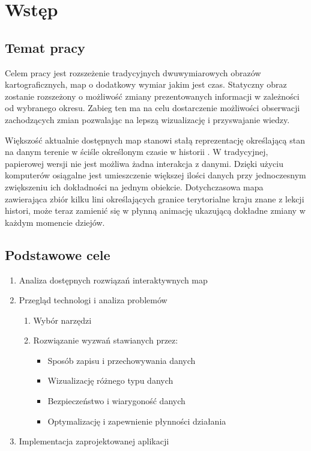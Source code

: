\chapter{Wstęp}
\label{cha:wstep}

\nocite{gisSystems}
\nocite{webgis}
\nocite{imprxml}
\nocite{perfxml}



\section{Temat pracy}
\label{sec:tematPracy}

Celem pracy jest rozszeżenie tradycyjnych dwuwymiarowych obrazów kartograficznych, map o dodatkowy wymiar jakim jest czas.
Statyczny obraz zostanie rozszeżony o możliwość zmiany prezentowanych informacji w zależności od wybranego okresu.
Zabieg ten ma na celu dostarczenie możliwości obserwacji zachodzących zmian pozwalając na lepszą wizualizację i
przyswajanie wiedzy.

Większość aktualnie dostępnych map stanowi stałą reprezentację określającą stan na danym terenie w ściśle określonym
czasie w historii . W tradycyjnej, papierowej wersji nie jest możliwa żadna interakcja z danymi. Dzięki użyciu komputerów
osiągalne jest umieszczenie
większej ilości danych przy jednoczesnym zwiększeniu ich dokładności na jednym obiekcie. Dotychczasowa mapa zawierająca
zbiór kilku lini określających granice terytorialne kraju znane z lekcji histori, może teraz zamienić się w płynną
animację ukazującą dokładne zmiany w każdym momencie dziejów.



\section{Podstawowe cele}
\label{sec:geneza}

\begin{enumerate}
  \item Analiza dostępnych rozwiązań interaktywnych map
  \item Przegląd technologi i analiza problemów
  \begin{enumerate}
    \item Wybór narzędzi
    \item Rozwiązanie wyzwań stawianych przez:
    \begin{itemize}
        \item Sposób zapisu i przechowywania danych
        \item Wizualizację różnego typu danych
        \item Bezpieczeństwo i wiarygoność danych
        \item Optymalizację i zapewnienie płynności działania
    \end{itemize}
  \end{enumerate}
  \item Implementacja zaprojektowanej aplikacji
\end{enumerate}

